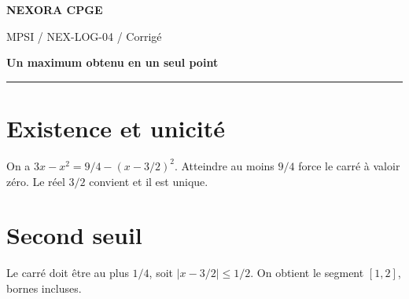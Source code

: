 \documentclass[11pt,a4paper]{article}
\begin{document}
{\small\bfseries\color{nexorablue} NEXORA CPGE}\par
{\small MPSI / NEX-LOG-04 / Corrigé}\par
{\LARGE\bfseries Un maximum obtenu en un seul point}\par
\vspace{0.25em}\hrule\vspace{0.6em}

\section*{Existence et unicité}
On a $3x-x^2=9/4-(x-3/2)^2$. Atteindre au moins $9/4$ force le carré à valoir zéro. Le réel $3/2$ convient et il est unique.

\section*{Second seuil}
Le carré doit être au plus $1/4$, soit $|x-3/2|\le1/2$. On obtient le segment $[1,2]$, bornes incluses.
\end{document}
